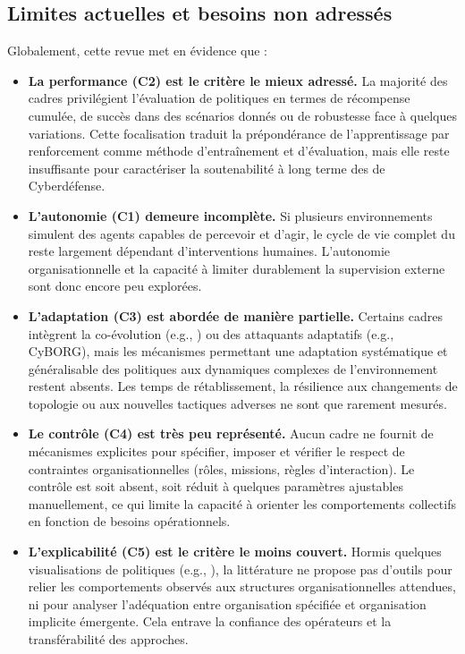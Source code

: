 \subsection{Limites actuelles et besoins non adressés}

Globalement, cette revue met en évidence que :
\begin{itemize}
  \item \textbf{La performance (C2) est le critère le mieux adressé.} La majorité des cadres privilégient l'évaluation de politiques en termes de récompense cumulée, de succès dans des scénarios donnés ou de robustesse face à quelques variations. Cette focalisation traduit la prépondérance de l'apprentissage par renforcement comme méthode d'entraînement et d'évaluation, mais elle reste insuffisante pour caractériser la soutenabilité à long terme des  de Cyberdéfense.

  \item \textbf{L'autonomie (C1) demeure incomplète.} Si plusieurs environnements simulent des agents capables de percevoir et d'agir, le cycle de vie complet du  reste largement dépendant d'interventions humaines. L'autonomie organisationnelle et la capacité à limiter durablement la supervision externe sont donc encore peu explorées.

  \item \textbf{L'adaptation (C3) est abordée de manière partielle.} Certains cadres intègrent la co-évolution (e.g., ) ou des attaquants adaptatifs (e.g., CyBORG), mais les mécanismes permettant une adaptation systématique et généralisable des politiques aux dynamiques complexes de l'environnement restent absents. Les temps de rétablissement, la résilience aux changements de topologie ou aux nouvelles tactiques adverses ne sont que rarement mesurés.

  \item \textbf{Le contrôle (C4) est très peu représenté.} Aucun cadre ne fournit de mécanismes explicites pour spécifier, imposer et vérifier le respect de contraintes organisationnelles (rôles, missions, règles d'interaction). Le contrôle est soit absent, soit réduit à quelques paramètres ajustables manuellement, ce qui limite la capacité à orienter les comportements collectifs en fonction de besoins opérationnels.

  \item \textbf{L'explicabilité (C5) est le critère le moins couvert.} Hormis quelques visualisations de politiques (e.g., ), la littérature ne propose pas d'outils pour relier les comportements observés aux structures organisationnelles attendues, ni pour analyser l'adéquation entre organisation spécifiée et organisation implicite émergente. Cela entrave la confiance des opérateurs et la transférabilité des approches.
\end{itemize}

